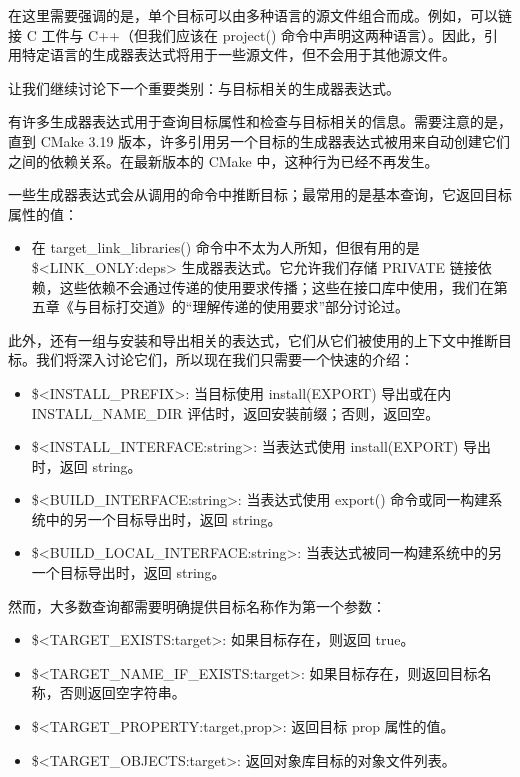 在这里需要强调的是，单个目标可以由多种语言的源文件组合而成。例如，可以链接 C 工件与 C++（但我们应该在 project() 命令中声明这两种语言）。因此，引用特定语言的生成器表达式将用于一些源文件，但不会用于其他源文件。

让我们继续讨论下一个重要类别：与目标相关的生成器表达式。


有许多生成器表达式用于查询目标属性和检查与目标相关的信息。需要注意的是，直到 CMake 3.19 版本，许多引用另一个目标的生成器表达式被用来自动创建它们之间的依赖关系。在最新版本的 CMake 中，这种行为已经不再发生。

一些生成器表达式会从调用的命令中推断目标；最常用的是基本查询，它返回目标属性的值：


\begin{itemize}
\item
在 target\_link\_libraries() 命令中不太为人所知，但很有用的是 \$<LINK\_ONLY:deps> 生成器表达式。它允许我们存储 PRIVATE 链接依赖，这些依赖不会通过传递的使用要求传播；这些在接口库中使用，我们在第五章《与目标打交道》的“理解传递的使用要求”部分讨论过。
\end{itemize}

此外，还有一组与安装和导出相关的表达式，它们从它们被使用的上下文中推断目标。我们将深入讨论它们，所以现在我们只需要一个快速的介绍：

\begin{itemize}
\item
\$<INSTALL\_PREFIX>: 当目标使用 install(EXPORT) 导出或在内 INSTALL\_NAME\_DIR 评估时，返回安装前缀；否则，返回空。

\item
\$<INSTALL\_INTERFACE:string>: 当表达式使用 install(EXPORT) 导出时，返回 string。

\item
\$<BUILD\_INTERFACE:string>: 当表达式使用 export() 命令或同一构建系统中的另一个目标导出时，返回 string。

\item
\$<BUILD\_LOCAL\_INTERFACE:string>: 当表达式被同一构建系统中的另一个目标导出时，返回 string。
\end{itemize}

然而，大多数查询都需要明确提供目标名称作为第一个参数：

\begin{itemize}
\item
\$<TARGET\_EXISTS:target>: 如果目标存在，则返回 true。

\item
\$<TARGET\_NAME\_IF\_EXISTS:target>: 如果目标存在，则返回目标名称，否则返回空字符串。

\item
\$<TARGET\_PROPERTY:target,prop>: 返回目标 prop 属性的值。

\item
\$<TARGET\_OBJECTS:target>: 返回对象库目标的对象文件列表。
\end{itemize}

